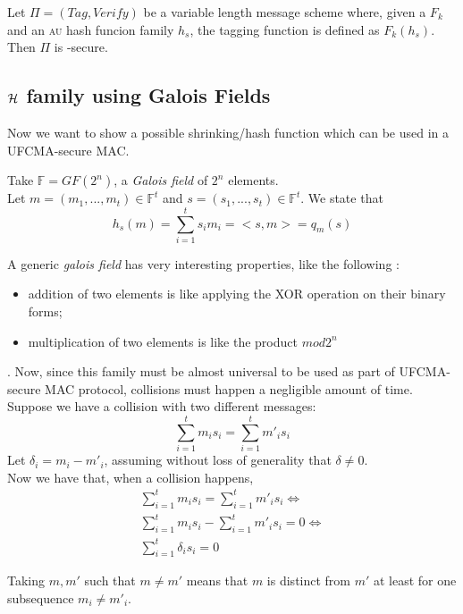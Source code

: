 \begin{corollary}
    Let $\Pi = (\textit{Tag}, \textit{Verify})$ be a variable length message \mac{} scheme where, given a \prf{} $F_k$ and an \textsc{au} hash funcion family $h_s$, the tagging function is defined as $F_k(h_s)$. Then $\Pi$ is \ufcma-secure.
\end{corollary}

\subsection{$\mathcal{H}$ family using Galois Fields}
Now we want to show a possible shrinking/hash function which can be used in a
UFCMA-secure MAC.

\begin{construction}
    Take $ \mathbb{F}=GF(2^{n})$, a \textit{Galois field} of $2^{n}$
    elements.\\
    Let $m=(m_{1}, ..., m_{t}) \in \mathbb{F}^{t} $ and $s=(s_{1}, ...,
    s_{t}) \in \mathbb{F}^{t} $. We state that 
    \[
        h_{s}(m)= \sum_{i=1}^{t}s_{i}m_{i}=<s,m>=q_{m}(s)
       \]
\end{construction}

A generic \textit{galois field} has very interesting properties, like the
following :
\begin{itemize}
    \item addition of two elements is like applying the XOR operation on their
        binary forms;
    \item multiplication of two elements is like the product $mod 2^{n}$
\end{itemize}.
Now, since this family must be almost universal to be used as part of
UFCMA-secure MAC protocol, collisions must happen a negligible amount of
time.\\
Suppose we have a collision with two different messages:
\[
     \sum_{i=1}^{t} m_{i}s_{i}=\sum_{i=1}^{t} m'_{i}s_{i}
\]
Let $\delta_{i}=m_{i}-m'_{i}$, assuming  without loss of generality that
$\delta \not= 0$.\\
Now we have that, when a collision happens, 
\begin{gather*}
    \sum_{i=1}^{t} m_{i}s_{i}=\sum_{i=1}^{t} m'_{i}s_{i}\Leftrightarrow \\
    \sum_{i=1}^{t} m_{i}s_{i}-\sum_{i=1}^{t} m'_{i}s_{i}=0 \Leftrightarrow \\
    \sum_{i=1}^{t} \delta_{i}s_{i}=0 
\end{gather*}

Taking $m, m'$ such that $m \not= m'$ means that $m$ is distinct from $m'$ at least for one subsequence $m_{i}\not=m'_{i}$.

